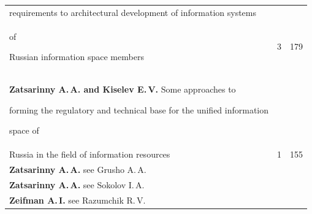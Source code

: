 {\begin{tabular}{p{311pt}rr}
requirements to architectural development of information systems\linebreak


\\[-12pt]


\hspace*{21pt}of


Russian information space members&3&179\\


\hangindent=21pt\noindent\textbf{Zatsarinny A.\,A. and Kiselev E.\,V.} Some approaches to


forming the regulatory and technical base for the unified information


space of\linebreak


\\[-12pt]


\hspace*{21pt}Russia in the field of information resources&1&155\\


\textbf{Zatsarinny A.\,A.} see Grusho A.\,A.&&\\


\textbf{Zatsarinny A.\,A.} see Sokolov I.\,A.&&\\


\textbf{Zeifman A.\,I.} see Razumchik R.\,V.&&\\





\end{tabular}


}





\def\leftfootline{\small{\textbf{\thepage}


\hfill Sistemy i Sredstva Informatiki~---


Systems and Means of Informatics 2015 vol~25 no\,4}


}%


 \def\rightfootline{\small{Sistemy i Sredstva Informatiki~---


 Systems and Means of Informatics   2015   vol~25   no\,4


\hfill \textbf{\thepage}}}


 \label{end\stat}


